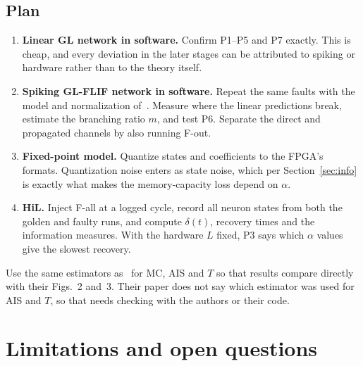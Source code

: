\documentclass[11pt,a4paper]{article}
\begin{document}
\subsection{Plan}

\begin{enumerate}
  \item \textbf{Linear GL network in software.} Confirm P1--P5 and P7 exactly. This is cheap, and every deviation in the later stages can be attributed to spiking or hardware rather than to the theory itself.
  \item \textbf{Spiking GL-FLIF network in software.} Repeat the same faults with the model and normalization of~\cite{mastin2026}. Measure where the linear predictions break, estimate the branching ratio $m$, and test P6. Separate the direct and propagated channels by also running F-out.
  \item \textbf{Fixed-point model.} Quantize states and coefficients to the FPGA's formats. Quantization noise enters as state noise, which per Section~\ref{sec:info} is exactly what makes the memory-capacity loss depend on $\alpha$.
  \item \textbf{HiL.} Inject F-all at a logged cycle, record all neuron states from both the golden and faulty runs, and compute $\delta(t)$, recovery times and the information measures. With the hardware $L$ fixed, P3 says which $\alpha$ values give the slowest recovery.
\end{enumerate}

Use the same estimators as~\cite{mastin2026} for MC, AIS and $T$ so that results compare directly with their Figs.~2 and~3. Their paper does not say which estimator was used for AIS and $T$, so that needs checking with the authors or their code.

\section{Limitations and open questions}
\end{document}
